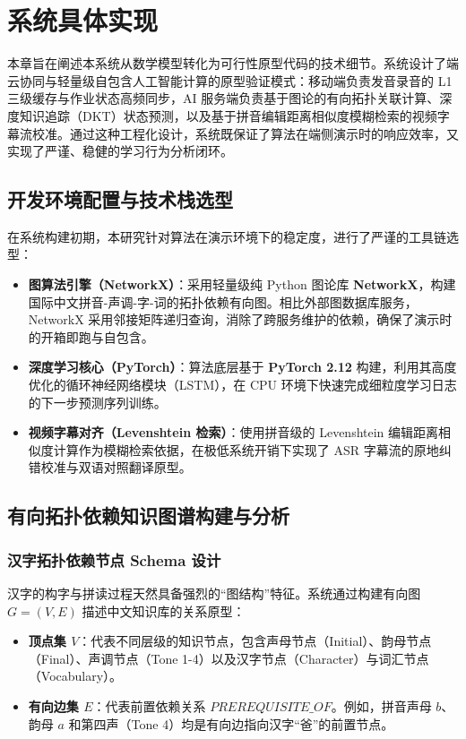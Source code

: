 \chapter{系统具体实现}

本章旨在阐述本系统从数学模型转化为可行性原型代码的技术细节。系统设计了端云协同与轻量级自包含人工智能计算的原型验证模式：移动端负责发音录音的 L1 三级缓存与作业状态高频同步，AI 服务端负责基于图论的有向拓扑关联计算、深度知识追踪（DKT）状态预测，以及基于拼音编辑距离相似度模糊检索的视频字幕流校准。通过这种工程化设计，系统既保证了算法在端侧演示时的响应效率，又实现了严谨、稳健的学习行为分析闭环。

\section{开发环境配置与技术栈选型}

在系统构建初期，本研究针对算法在演示环境下的稳定度，进行了严谨的工具链选型：
\begin{itemize}
    \item \textbf{图算法引擎（NetworkX）}：采用轻量级纯 Python 图论库 \textbf{NetworkX}，构建国际中文拼音-声调-字-词的拓扑依赖有向图。相比外部图数据库服务，NetworkX 采用邻接矩阵递归查询，消除了跨服务维护的依赖，确保了演示时的开箱即跑与自包含。
    \item \textbf{深度学习核心（PyTorch）}：算法底层基于 \textbf{PyTorch 2.12} 构建，利用其高度优化的循环神经网络模块（LSTM），在 CPU 环境下快速完成细粒度学习日志的下一步预测序列训练。
    \item \textbf{视频字幕对齐（Levenshtein 检索）}：使用拼音级的 Levenshtein 编辑距离相似度计算作为模糊检索依据，在极低系统开销下实现了 ASR 字幕流的原地纠错校准与双语对照翻译原型。
\end{itemize}

\section{有向拓扑依赖知识图谱构建与分析}

\subsection{汉字拓扑依赖节点 Schema 设计}
汉字的构字与拼读过程天然具备强烈的“图结构”特征。系统通过构建有向图 $G = (V, E)$ 描述中文知识库的关系原型：
\begin{itemize}
    \item \textbf{顶点集 $V$}：代表不同层级的知识节点，包含声母节点（Initial）、韵母节点（Final）、声调节点（Tone 1-4）以及汉字节点（Character）与词汇节点（Vocabulary）。
    \item \textbf{有向边集 $E$}：代表前置依赖关系 $PREREQUISITE\_OF$。例如，拼音声母 $b$、韵母 $a$ 和第四声（Tone 4）均是有向边指向汉字“爸”的前置节点。
\end{itemize}

